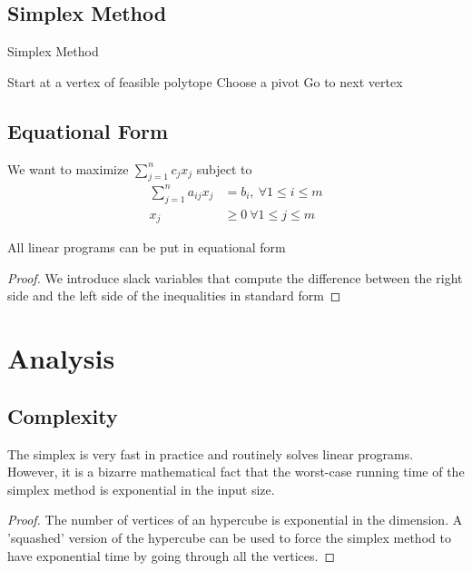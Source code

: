 \documentclass[12pt]{cours}
\begin{document}
\subsection{Simplex Method}
\begin{algorithm}
    \caption{Simplex Method}
    \begin{algorithmic}
        \State Start at a vertex of feasible polytope
            \State Choose a pivot
            \State Go to next vertex
        \EndWhile
    \end{algorithmic}
\end{algorithm}

\subsection{Equational Form}
\begin{definition}
    We want to maximize $\sum_{j = 1}^{n} c_{j}x_{j}$ subject to 
    \[
        \begin{aligned}
            \sum_{j = 1}^{n}a_{ij}x_{j} &= b_{i}, \ \forall 1 \leq i \leq m\\
            x_{j} &\geq 0 \ \forall 1 \leq j \leq m
        \end{aligned}
    \]
\end{definition}
\begin{proposition}
    All linear programs can be put in equational form
\end{proposition}
\begin{proof}
    We introduce slack variables that compute the difference between the right side and the left side of the inequalities in standard form
\end{proof}

\section{Analysis}
\subsection{Complexity}
\begin{proposition}
    The simplex is very fast in practice and routinely solves linear programs. However, it is a bizarre mathematical fact that the worst-case running time of the simplex method is exponential in the input size. \\
\end{proposition}
\begin{proof}
    The number of vertices of an hypercube is exponential in the dimension. A 'squashed' version of the hypercube can be used to force the simplex method to have exponential time by going through all the vertices. 
\end{proof}
\end{document}
